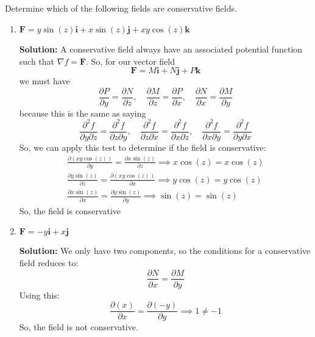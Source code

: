 \documentclass[letterpaper, 11pt]{article}
\begin{document}
\subsection{} Determine which of the following fields are conservative fields. 
\begin{enumerate}[label=(\alph*)]
\item $\bm{F} = y \sin(z)\bm{i} + x \sin(z)\bm{j} + xy \cos(z)\bm{k} $
\par \textbf{Solution:} A conservative field always have an associated potential function such that $\nabla f = \bm{F}$. So, for our vector field
\[ \bm{F} = M \bm{i} + N \bm{j} + P \bm{k}\]
we must have 
\[\frac{ \partial P}{\partial y} = \frac{ \partial N}{\partial z}, \quad \frac{ \partial M}{\partial z} = \frac{ \partial P}{\partial x}, \quad \frac{ \partial N}{\partial x} = \frac{ \partial M}{\partial y}\]
because this is the same as saying
\[ \frac{\partial^2 f}{\partial y \partial z} = \frac{\partial^2 f}{\partial z \partial y}, \quad \frac{\partial^2 f}{\partial z \partial x} = \frac{\partial^2 f}{\partial x \partial z}, \quad\frac{\partial^2 f}{\partial x \partial y} = \frac{\partial^2 f}{\partial y \partial x} \]
So, we can apply this test to determine if the field is conservative:
\begin{gather*}
\frac{ \partial (xy\cos(z))}{\partial y} = \frac{ \partial x \sin(z)}{\partial z} \implies x \cos(z) = x \cos(z) \\
 \frac{ \partial y \sin(z)}{\partial z} = \frac{ \partial (xy\cos(z))}{\partial x} \implies y \cos(z) = y \cos (z)  \\
  \frac{ \partial x \sin(z)}{\partial x} = \frac{ \partial y \sin(z)}{\partial y} \implies \sin(z) = \sin(z)
\end{gather*}
So, the field is conservative

\item $\bm{F}=-y\bm{i}+x\bm{j}$
\par \textbf{Solution:} We only have two components, so the conditions for a conservative field reduces to:
\[ \frac{ \partial N}{\partial x} = \frac{ \partial M}{\partial y}\]
Using this:
\[ \frac{\partial (x)}{\partial x} = \frac{\partial (-y)}{\partial y} \implies 1 \neq -1\]
So, the field is not conservative. 



\end{enumerate}
\end{document}
